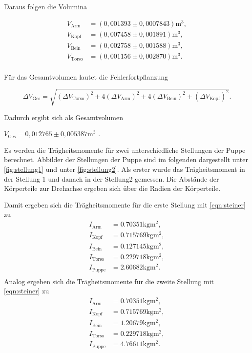Daraus folgen die Volumina

\begin{align*}
  V_{\text{Arm}} &= (0,001393 \pm 0,0007843) \si{\meter}^3, \\
  V_{\text{Kopf}} &= (0,007458 \pm 0,001891) \si{\meter}^3, \\
  V_{\text{Bein}} &= (0,002758 \pm 0,001588) \si{\meter}^3 ,\\
  V_{\text{Torso}} &= (0,001156 \pm 0,002870) \si{\meter}^3. \\
\end{align*}


Für das Gesamtvolumen lautet die Fehlerfortpflanzung

\begin{equation}
  \Delta V_{\text{Ges}} = \sqrt{(\Delta V_{\text{Torso}})^2 + 4(\Delta V_{\text{Arm}})^2 + 4(\Delta V_{\text{Bein}})^2 + (\Delta V_{\text{Kopf}})^2}.
\end{equation}


Dadurch ergibt sich als Gesamtvolumen

\begin{center}
  $V_{\text{Ges}} = 0,012765 \pm 0,005387 \si{\meter}^3$ .
\end{center}


Es werden die Trägheitsmomente für zwei unterschiedliche Stellungen der Puppe berechnet. Abbilder der Stellungen der Puppe sind im folgenden
dargestellt unter \autoref{fig:stellung1} und unter \autoref{fig:stellung2}. 
Als erster wurde das Trägheitsmoment in der Stellung 1 und danach in der Stellung2 gemessen.
Die Abstände der Körperteile zur Drehachse ergeben sich über die Radien der Körperteile.

Damit ergeben sich die Trägheitsmomente für die erste Stellung  mit \autoref{eqn:steiner} zu
\begin{align*}
  I_{\text{Arm}} &= 0.70351 \si{\kilogram\meter^2}, \\
  I_{\text{Kopf}} &= 0.715769 \si{\kilogram\meter^2}, \\
  I_{\text{Bein}} &= 0.127145 \si{\kilogram\meter^2}, \\
  I_{\text{Torso}} &= 0.229718 \si{\kilogram\meter^2}, \\
  I_{\text{Puppe}} &= 2.60682 \si{\kilogram\meter^2}. \\
\end{align*}
Analog ergeben sich die Trägheitsmomente für die zweite Stellung mit \autoref{eqn:steiner} zu
\begin{align*}
  I_{\text{Arm}} &= 0.70351 \si{\kilogram\meter^2}, \\
  I_{\text{Kopf}} &= 0.715769 \si{\kilogram\meter^2}, \\
  I_{\text{Bein}} &= 1.20679 \si{\kilogram\meter^2}, \\ 
  I_{\text{Torso}} &= 0.229718 \si{\kilogram\meter^2}, \\
  I_{\text{Puppe}} &= 4.76611 \si{\kilogram\meter^2}. \\
\end{align*}


